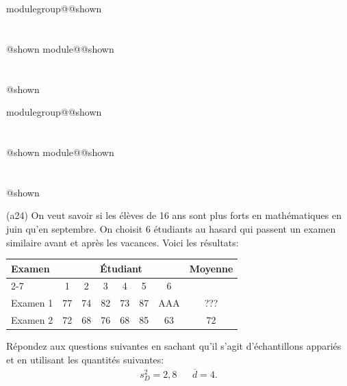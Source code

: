 \documentclass{Evaluation}
\makeatletter
\newcommand{\currentmodulekey}{}
\newcommand{\currentmoduletitle}{}
\newcommand{\currentgroupkey}{}
\newcommand{\currentgrouptitle}{}
\newcommand{\showmoduleifneeded}{%
  \ifx\currentgroupkey\empty\else
    \expandafter\ifx\csname modulegroup@\currentgroupkey @shown\endcsname\relax
      \section*{\currentgrouptitle}%
      \expandafter\gdef\csname modulegroup@\currentgroupkey @shown\endcsname{1}%
    \fi
  \fi
  \expandafter\ifx\csname module@\currentmodulekey @shown\endcsname\relax
    \section*{\currentmoduletitle}%
    \expandafter\gdef\csname module@\currentmodulekey @shown\endcsname{1}%
  \fi
}
\newenvironment{A24}{\showmoduleifneeded}{}
\makeatother
\begin{document}
\begin{questions}
\begin{A24}
\begin{parts}
\begin{subparts}
    \end{subparts}
\end{parts}
\end{A24}

\begin{A24}
\question 
(a24)
On veut savoir si les élèves de 16 ans sont plus forts en mathématiques en juin qu’en septembre. 
On choisit 6 étudiants au hasard qui passent un examen similaire avant et après les vacances. 
Voici les résultats:
\begin{center}
\renewcommand{\arraystretch}{1.5}
    \begin{tabular}{|l|cccccc|c|}
        \hline
        \multirow{2}{*}{Examen} & \multicolumn{6}{c|}{Étudiant} & \multirow{2}{*}{Moyenne} \\
        \cline{2-7}
         & 1 & 2 & 3 & 4 & 5 & 6 & \\
        \hline
        Examen 1 & 77 & 74 & 82 & 73 & 87 & AAA & ??? \\
        Examen 2 & 72 & 68 & 76 & 68 & 85 & 63 & 72\\
        \hline
    \end{tabular}
\end{center}

Répondez aux questions suivantes en sachant qu'il s'agit d'{échantillons appariés} et en utilisant les quantités suivantes: 
\begin{align*}
    s_D^2=2,8 & & \overline{d}=4.
\end{align*}

 

\end{A24}
\end{questions}
\end{document}
